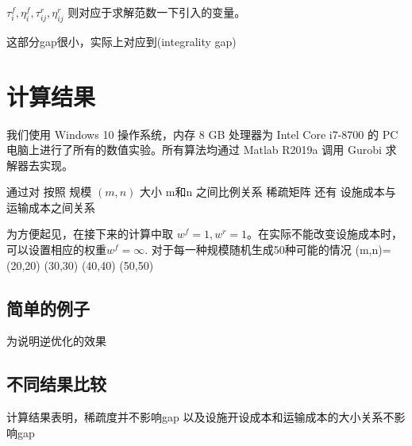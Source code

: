 \documentclass[UTF8]{article}
\begin{document}
$\tau_{i}^{f},\eta_{i}^{f},\tau_{i j}^r,\eta_{i j}^{r}$ 则对应于求解范数一下引入的变量。 \par


这部分gap很小，实际上对应到(integrality gap)

%
%

\section{计算结果}

我们使用 Windows 10 操作系统，内存 8 GB 处理器为 Intel Core i7-8700 的 PC 电脑上进行了所有的数值实验。所有算法均通过 Matlab R2019a 调用 Gurobi 求解器去实现。

通过对
按照 规模 $(m,n)$ 大小  m和n 之间比例关系 稀疏矩阵 还有  设施成本与运输成本之间关系

为方便起见，在接下来的计算中取 $w^f=1,w^r=1$。在实际不能改变设施成本时，可以设置相应的权重$w^f=\infty$.
对于每一种规模随机生成50种可能的情况
(m,n)= (20,20) (30,30) (40,40) (50,50)

\subsection{简单的例子}
为说明逆优化的效果

\subsection{不同结果比较}

计算结果表明，稀疏度并不影响gap
以及设施开设成本和运输成本的大小关系不影响gap
\end{document}
